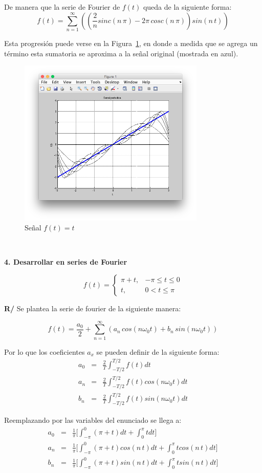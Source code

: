 \documentclass[twocolumn]{article}
\begin{document}
De manera que la serie de Fourier de $f(t)$ queda de la siguiente forma:
$$f(t) = \sum_{n=1}^\infty\left(\left(\frac{2}{n}sinc(n\,\pi) -2\pi\,cosc(n\,\pi)\right)sin(n\,t)\right)$$

Esta progresión puede verse en la Figura~\ref{fig_3}, en donde a medida que se agrega un término esta sumatoria se aproxima a la señal original (mostrada en azul).

\begin{figure}[!t]
\centering
\includegraphics[width=3.5in]{imgs/lin.png}
\caption{Señal $f(t) = t$}
\label{fig_3}
\end{figure}

$\,$

\textbf{4. Desarrollar en series de Fourier}

$$f(t) = \begin{cases}
\pi +t, &-\pi \leq t \leq 0\\
t, &0 < t \leq \pi
\end{cases}$$

\textbf{R/} Se plantea la serie de fourier de la siguiente manera:

$$f(t) = \frac{a_0}{2} + \sum_{n=1}^\infty\left(a_n\,cos(n\omega_0t) + b_n\,sin(n\omega_0t)\right)$$

Por lo que los coeficientes $a_x$ se pueden definir de la siguiente forma:
\begin{eqnarray*}
a_0 &=& \frac{2}{T}\int_{-T/2}^{T/2}f(t)dt\\
a_n &=& \frac{2}{T}\int_{-T/2}^{T/2}f(t)cos(n\omega_0t)dt\\
b_n &=& \frac{2}{T}\int_{-T/2}^{T/2}f(t)sin(n\omega_0t)dt
\end{eqnarray*}

Reemplazando por las variables del enunciado se llega a:
\begin{eqnarray*}
a_0 &=& \frac{1}{\pi} \bigg[ \int_{-\pi}^{0}(\pi + t) dt + \int_{0}^{\pi}t dt \bigg] \\
a_n &=&\frac{1}{\pi} \bigg[ \int_{-\pi}^{0}(\pi + t)cos(n\,t) dt + \int_{0}^{\pi}tcos(n\,t) dt \bigg] \\
b_n &=& \frac{1}{\pi} \bigg[ \int_{-\pi}^{0}(\pi + t)sin(n\,t) dt + \int_{0}^{\pi}tsin(n\,t) dt \bigg] 
\end{eqnarray*}
\end{document}
